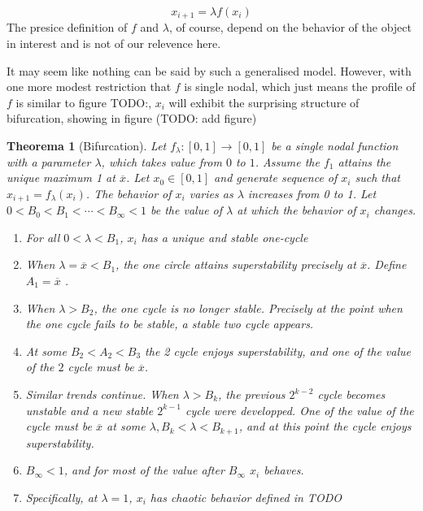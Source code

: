 \documentclass{report}
\newtheorem{thm}{Theorema}[chapter]
\theoremstyle{definition}
\theoremstyle{definition}
\theoremstyle{remark}
\newcommand{\mx}{\overline{x}}
\begin{document}
\begin{equation}
	x_{i+1}=\lambda f(x_i)
\end{equation}
The presice definition of $f$ and $\lambda$, of course, depend on the behavior of the object in interest and is not of our relevence here.

It may seem like nothing can be said by such a generalised model. However, with one more modest restriction that $f$ is single nodal, which just means the profile of $f$ is similar to figure TODO:, $x_i$ will exhibit the surprising structure of bifurcation, showing in figure (TODO: add figure)

\begin{thm}[Bifurcation]\label{th:general_bifurcation}
	Let $f_{\lambda}: [0,1] \rightarrow [0,1] $ be a single nodal function with a parameter $\lambda$, which takes value from $0$ to $1$. 
	Assume the $f_{1}$ attains the unique maximum 1 at $\mx$.
	Let $x_0 \in [0,1]$ and generate sequence of $x_i$ such that $x_{i+1} = f_{\lambda}(x_i)$.
	The behavior of $x_i$ varies as $\lambda$ increases from 0 to 1. Let $0 < B_0 < B_1 < \cdots < B_{\infty} < 1$ be the value of $\lambda$ at which the behavior of $x_i$ changes.

	\begin{enumerate}
		\item For all $0 <\lambda < B_1$, $x_i$ has a unique and stable one-cycle
		\item When $\lambda = \mx < B_1$, the one circle attains superstability precisely at $\mx$. Define $A_1 = \mx$ .
		\item When $\lambda > B_2$, the one cycle is no longer stable. Precisely at the point when the one cycle fails to be stable, a stable two cycle appears.
		\item At some $B_2 <A_2 < B_3$ the 2 cycle enjoys superstability, and one of the value of the $2$ cycle must be $\mx$.
		\item Similar trends continue. When $\lambda > B_k$, the previous $2^{k-2}$ cycle becomes unstable and a new stable $2^{k-1}$ cycle were developped. One of the value of the cycle must be $\mx$ at some $\lambda, B_k <\lambda < B_{k+1}$, and at this point the cycle enjoys superstability.
		\item $B_{\infty} < 1$, and for most of the value after $B_{\infty}$ $x_i$ behaves. 
		\item Specifically, at $\lambda = 1$, $x_i$ has chaotic behavior defined in TODO
	\end{enumerate}

\end{thm}
\end{document}
